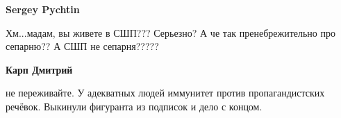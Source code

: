 \begin{itemize}
\begin{itemize}
\textbf{Sergey Pychtin} 

Хм...мадам, вы живете в СШП??? Серьезно? А че так пренебрежительно про
сепарню?? А СШП не сепарня?????


 
\textbf{Карп Дмитрий} 

не переживайте. У адекватных людей иммунитет против пропагандистских речёвок.
Выкинули фигуранта из подписок и дело с концом.

\end{itemize}

\end{itemize}


